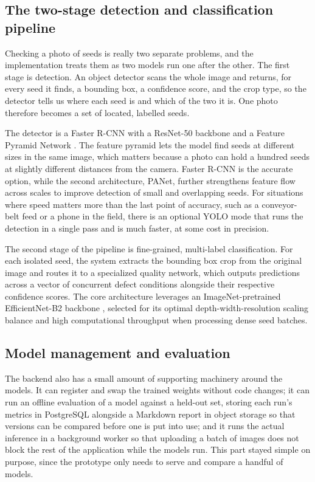 \subsection{The two-stage detection and classification pipeline}

Checking a photo of seeds is really two separate problems, and the
implementation treats them as two models run one after the other. The first
stage is detection. An object detector scans the whole image and returns, for
every seed it finds, a bounding box, a confidence score, and the crop type, so the detector tells us where each seed is and which of the two it is. One photo therefore becomes a set of located, labelled seeds.

The detector is a Faster R-CNN \cite{fasterrcnn2015} with a ResNet-50 backbone \cite{resnet2015} and a Feature Pyramid Network \cite{lin2017fpn}. The feature pyramid lets the model find seeds at different sizes in the same image, which matters because a photo can hold a hundred seeds at slightly different distances from the camera. Faster R-CNN is the accurate option, while the second architecture, PANet, further strengthens feature flow across scales to improve detection of small and overlapping seeds. For situations where speed matters more than the last point of accuracy, such as a conveyor-belt feed or a phone in the field, there is an optional YOLO mode \cite{redmon2016yolo, yolov8} that runs the detection in a single pass and is much faster, at some cost in precision.

The second stage of the pipeline is fine-grained, multi-label classification. For each isolated seed, the system extracts the bounding box crop from the original image and routes it to a specialized quality network, which outputs predictions across a vector of concurrent defect conditions alongside their respective confidence scores. The core architecture leverages an ImageNet-pretrained EfficientNet-B2 backbone \cite{tan2019efficientnet}, selected for its optimal depth-width-resolution scaling balance and high computational throughput when processing dense seed batches.

\subsection{Model management and evaluation}

The backend also has a small amount of supporting machinery around the models.
It can register and swap the trained weights without code changes; it can run an
offline evaluation of a model against a held-out set, storing each run's metrics
in PostgreSQL alongside a Markdown report in object storage so that versions can
be compared before one is put into use; and it runs the actual inference in a
background worker so that uploading a batch of images does not block the rest of
the application while the models run. This part stayed simple on purpose, since
the prototype only needs to serve and compare a handful of models.

